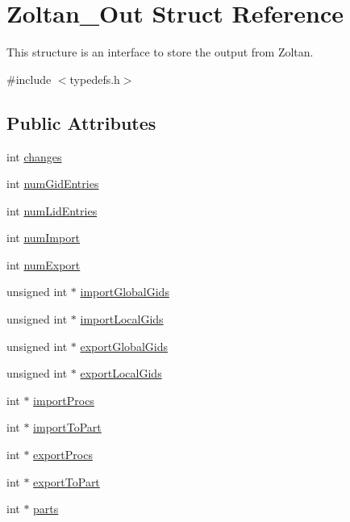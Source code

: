 \hypertarget{structZoltan__Out}{}\section{Zoltan\+\_\+\+Out Struct Reference}
\label{structZoltan__Out}


This structure is an interface to store the output from Zoltan.  




{\ttfamily \#include $<$typedefs.\+h$>$}

\subsection*{Public Attributes}
\begin{DoxyCompactItemize}
\item 
int \mbox{\hyperlink{structZoltan__Out_a4a16fd4f8cc9d38d47810055e8b7b97b}{changes}}
\item 
int \mbox{\hyperlink{structZoltan__Out_a9ec8c391f2218e927b8e9f31fd49ee72}{num\+Gid\+Entries}}
\item 
int \mbox{\hyperlink{structZoltan__Out_a1de4e895402c6a3ceb3735c70ec88c23}{num\+Lid\+Entries}}
\item 
int \mbox{\hyperlink{structZoltan__Out_a3ec6846e956ee5337cb94c69b8bef4ce}{num\+Import}}
\item 
int \mbox{\hyperlink{structZoltan__Out_ae3c782bd4b01650d2ec6f970ec0df24b}{num\+Export}}
\item 
unsigned int $\ast$ \mbox{\hyperlink{structZoltan__Out_a2c70ebf8c353ba745560459779090703}{import\+Global\+Gids}}
\item 
unsigned int $\ast$ \mbox{\hyperlink{structZoltan__Out_aaabd5873a7bd360c3d02499c13455bc2}{import\+Local\+Gids}}
\item 
unsigned int $\ast$ \mbox{\hyperlink{structZoltan__Out_a41a465f7840cecafd959c81c56d57e9d}{export\+Global\+Gids}}
\item 
unsigned int $\ast$ \mbox{\hyperlink{structZoltan__Out_a7a5c47580bc0a77cd51f0179b0b9d92b}{export\+Local\+Gids}}
\item 
int $\ast$ \mbox{\hyperlink{structZoltan__Out_a6421b3c6ccec98151928ef6461be97e2}{import\+Procs}}
\item 
int $\ast$ \mbox{\hyperlink{structZoltan__Out_ac8fcf42b3806fe7b52f5455d67814098}{import\+To\+Part}}
\item 
int $\ast$ \mbox{\hyperlink{structZoltan__Out_a934d6621722a687a3d8b7bf43c259816}{export\+Procs}}
\item 
int $\ast$ \mbox{\hyperlink{structZoltan__Out_ab2a81da9a9d6ac69b69f5db89e97c6bf}{export\+To\+Part}}
\item 
int $\ast$ \mbox{\hyperlink{structZoltan__Out_addc3ad3c22e6fb8e7073de71425d4ead}{parts}}
\end{DoxyCompactItemize}


